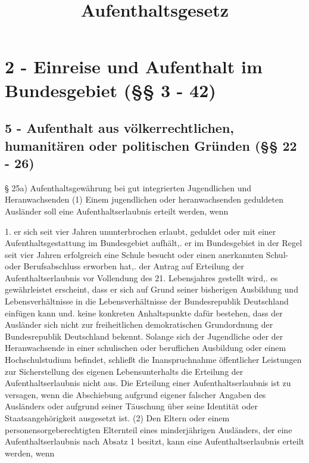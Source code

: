 \title{Aufenthaltsgesetz}
\chapter{ 2 - Einreise und Aufenthalt im Bundesgebiet (§§ 3 - 42)}
\section{ 5 - Aufenthalt aus völkerrechtlichen, humanitären oder politischen Gründen (§§ 22 - 26)}

§ 25a)\newline
Aufenthaltsgewährung bei gut integrierten Jugendlichen und Heranwachsenden\newline
(1) Einem jugendlichen oder heranwachsenden geduldeten Ausländer soll eine Aufenthaltserlaubnis erteilt werden, wenn\newline

1.	er sich seit vier Jahren ununterbrochen erlaubt, geduldet oder mit einer Aufenthaltsgestattung im Bundesgebiet aufhält,.	er im Bundesgebiet in der Regel seit vier Jahren erfolgreich eine Schule besucht oder einen anerkannten Schul- oder Berufsabschluss erworben hat,.	der Antrag auf Erteilung der Aufenthaltserlaubnis vor Vollendung des 21. Lebensjahres gestellt wird,.	es gewährleistet erscheint, dass er sich auf Grund seiner bisherigen Ausbildung und Lebensverhältnisse in die Lebensverhältnisse der Bundesrepublik Deutschland einfügen kann und.	keine konkreten Anhaltspunkte dafür bestehen, dass der Ausländer sich nicht zur freiheitlichen demokratischen Grundordnung der Bundesrepublik Deutschland bekennt.\newline
Solange sich der Jugendliche oder der Heranwachsende in einer schulischen oder beruflichen Ausbildung oder einem Hochschulstudium befindet, schließt die Inanspruchnahme öffentlicher Leistungen zur Sicherstellung des eigenen Lebensunterhalts die Erteilung der Aufenthaltserlaubnis nicht aus. Die Erteilung einer Aufenthaltserlaubnis ist zu versagen, wenn die Abschiebung aufgrund eigener falscher Angaben des Ausländers oder aufgrund seiner Täuschung über seine Identität oder Staatsangehörigkeit ausgesetzt ist.\newline
(2) Den Eltern oder einem personensorgeberechtigten Elternteil eines minderjährigen Ausländers, der eine Aufenthaltserlaubnis nach Absatz 1 besitzt, kann eine Aufenthaltserlaubnis erteilt werden, wenn\newline

